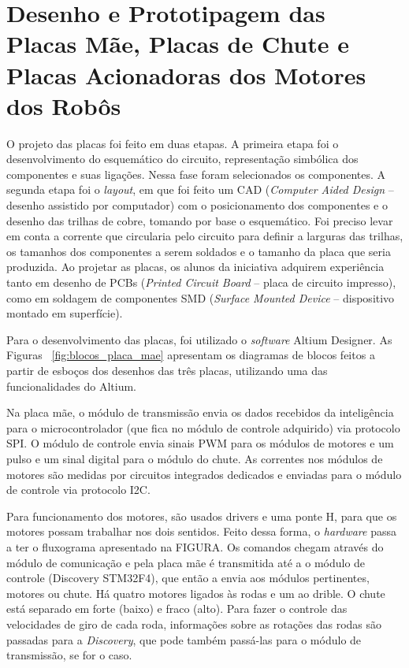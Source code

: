 \chapter{Desenho e Prototipagem das Placas Mãe, Placas de Chute e Placas Acionadoras dos Motores dos Robôs}\label{cap:design_placas}

O projeto das placas foi feito em duas etapas. A primeira etapa foi o desenvolvimento do esquemático do circuito, representação simbólica dos componentes e suas ligações. Nessa fase foram selecionados os componentes. A segunda etapa foi o \textit{layout}, em que foi feito um CAD (\textit{Computer Aided Design} ­– desenho assistido por computador) com o posicionamento dos componentes e o desenho das trilhas de cobre, tomando por base o esquemático. Foi preciso levar em conta a corrente que circularia pelo circuito para definir a larguras das trilhas, os tamanhos dos componentes a serem soldados e o tamanho da placa que seria produzida. Ao projetar as placas, os alunos da iniciativa adquirem experiência tanto em desenho de PCBs (\textit{Printed Circuit Board} – placa de circuito impresso), como em soldagem de componentes SMD (\textit{Surface Mounted Device} – dispositivo montado em superfície).

Para o desenvolvimento das placas, foi utilizado o \textit{software} Altium Designer. As Figuras ~\ref{fig:blocos_placa_mae} apresentam os diagramas de blocos feitos a partir de esboços dos desenhos das três placas, utilizando uma das funcionalidades do Altium.

Na placa mãe, o módulo de transmissão envia os dados recebidos da inteligência para o microcontrolador (que fica no módulo de controle adquirido) via protocolo SPI.
O módulo de controle envia sinais PWM para os módulos de motores e um pulso e um sinal digital para o módulo do chute. As correntes nos módulos de motores são medidas por circuitos integrados dedicados e enviadas para o módulo de controle via protocolo I2C.

Para funcionamento dos motores, são usados drivers e uma ponte H, para que os motores possam trabalhar nos dois sentidos.
Feito dessa forma, o \textit{hardware} passa a ter o fluxograma apresentado na FIGURA. Os comandos chegam através do módulo de comunicação e pela placa mãe é transmitida até a o módulo de controle (Discovery STM32F4), que então a envia aos módulos pertinentes, motores ou chute. Há quatro motores ligados às rodas e um ao drible. O chute está separado em forte (baixo) e fraco (alto). Para fazer o controle das velocidades de giro de cada roda, informações sobre as rotações das rodas são passadas para a \textit{Discovery}, que pode também passá-las para o módulo de transmissão, se for o caso.


